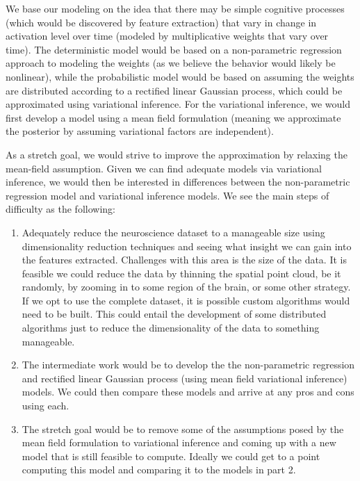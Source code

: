 \documentclass{article}[12pt]
\begin{document}
   We base our modeling on the idea that there may be simple cognitive processes (which would be discovered by feature extraction) that vary in change in activation level over time (modeled by multiplicative weights that vary over time).  The deterministic model would be based on a non-parametric regression approach to modeling the weights (as we believe the behavior would likely be nonlinear), while the probabilistic model would be based on assuming the weights are distributed according to a rectified linear Gaussian process, which could be approximated using variational inference. For the variational inference, we would first develop a model using a mean field formulation (meaning we approximate the posterior by assuming variational factors are independent). 
   
   As a stretch goal, we would strive to improve the approximation by relaxing the mean-field assumption. Given we can find adequate models via variational inference, we would then be interested in differences between the non-parametric regression model and variational inference models. We see the main steps of difficulty as the following:
   
   \begin{enumerate}
   	\item Adequately reduce the neuroscience dataset to a manageable size using dimensionality reduction techniques and seeing what insight we can gain into the features extracted. Challenges with this area is the size of the data. It is feasible we could reduce the data by thinning the spatial point cloud, be it randomly, by zooming in to some region of the brain, or some other strategy. If we opt to use the complete dataset, it is possible custom algorithms would need to be built. This could entail the development of some distributed algorithms just to reduce the dimensionality of the data to something manageable.
   	\item The intermediate work would be to develop the the non-parametric regression and rectified linear Gaussian process (using mean field variational inference) models. We could then compare these models and arrive at any pros and cons using each.
   	\item The stretch goal would be to remove some of the assumptions posed by the mean field formulation to variational inference and coming up with a new model that is still feasible to compute. Ideally we could get to a point computing this model and comparing it to the models in part 2.
   \end{enumerate}
   
\end{document}
